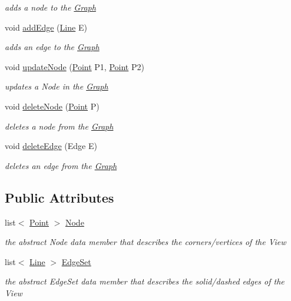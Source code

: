 \begin{DoxyCompactItemize}
\begin{DoxyCompactList}\small\item\em adds a node to the \mbox{\hyperlink{class_graph}{Graph}} \end{DoxyCompactList}\item 
void \mbox{\hyperlink{class_graph_a5c30bae1d7a0bbb2f9d9f0d5ad40f78f}{add\+Edge}} (\mbox{\hyperlink{class_line}{Line}} E)
\begin{DoxyCompactList}\small\item\em adds an edge to the \mbox{\hyperlink{class_graph}{Graph}} \end{DoxyCompactList}\item 
void \mbox{\hyperlink{class_graph_a285f720a5e75fc099dcc32fd4a37786a}{update\+Node}} (\mbox{\hyperlink{class_point}{Point}} P1, \mbox{\hyperlink{class_point}{Point}} P2)
\begin{DoxyCompactList}\small\item\em updates a Node in the \mbox{\hyperlink{class_graph}{Graph}} \end{DoxyCompactList}\item 
void \mbox{\hyperlink{class_graph_a74d50f92f6f2291675020e038132c85f}{delete\+Node}} (\mbox{\hyperlink{class_point}{Point}} P)
\begin{DoxyCompactList}\small\item\em deletes a node from the \mbox{\hyperlink{class_graph}{Graph}} \end{DoxyCompactList}\item 
void \mbox{\hyperlink{class_graph_a39031d4b9f6527501333e612cb91cca6}{delete\+Edge}} (Edge E)
\begin{DoxyCompactList}\small\item\em deletes an edge from the \mbox{\hyperlink{class_graph}{Graph}} \end{DoxyCompactList}\end{DoxyCompactItemize}
\subsection*{Public Attributes}
\begin{DoxyCompactItemize}
\item 
list$<$ \mbox{\hyperlink{class_point}{Point}} $>$ \mbox{\hyperlink{class_graph_abbffb935f6c2c6723a149d70bdb0762f}{Node}}
\begin{DoxyCompactList}\small\item\em the abstract Node data member that describes the corners/vertices of the View \end{DoxyCompactList}\item 
list$<$ \mbox{\hyperlink{class_line}{Line}} $>$ \mbox{\hyperlink{class_graph_aa8bbd434abc0c7a804ad7687b3ec2511}{Edge\+Set}}
\begin{DoxyCompactList}\small\item\em the abstract Edge\+Set data member that describes the solid/dashed edges of the View \end{DoxyCompactList}\end{DoxyCompactItemize}


